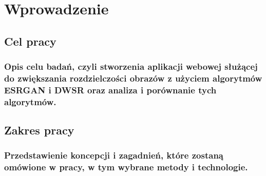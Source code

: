 \chapter{Wprowadzenie}
\section{Cel pracy}
\subsection{Opis celu badań, czyli stworzenia aplikacji webowej służącej do zwiększania rozdzielczości obrazów z użyciem algorytmów ESRGAN i DWSR oraz analiza i porównanie tych algorytmów.}
\section{Zakres pracy}
\subsection{Przedstawienie koncepcji i zagadnień, które zostaną omówione w pracy, w tym wybrane metody i technologie.}